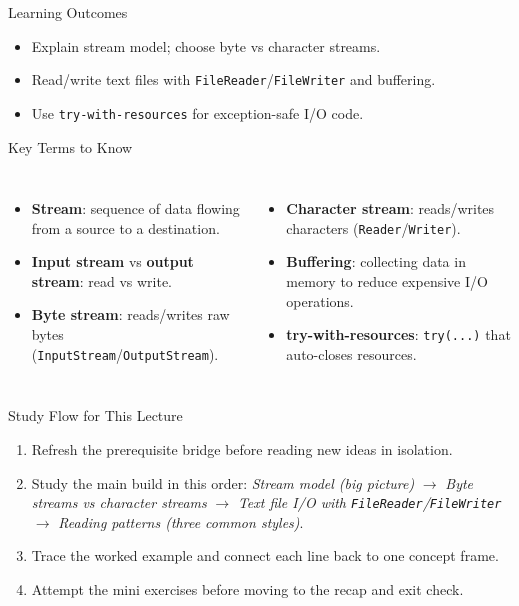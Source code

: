 \documentclass{beamer}
\begin{document}
\begin{frame}{Learning Outcomes}
  \begin{itemize}[<+->]
    \item Explain stream model; choose byte vs character streams.
    \item Read/write text files with \texttt{FileReader}/\texttt{FileWriter} and buffering.
    \item Use \texttt{try-with-resources} for exception-safe I/O code.
  \end{itemize}
  \slidesources{\OOPSUnitIIISources}
\end{frame}

\begin{frame}{Key Terms to Know}
\small
\begin{columns}[t]
\begin{itemize}
  \item \textbf{Stream}: sequence of data flowing from a source to a destination.
  \item \textbf{Input stream} vs \textbf{output stream}: read vs write.
  \item \textbf{Byte stream}: reads/writes raw bytes (\texttt{InputStream}/\texttt{OutputStream}).
\end{itemize}
\begin{itemize}
  \item \textbf{Character stream}: reads/writes characters (\texttt{Reader}/\texttt{Writer}).
  \item \textbf{Buffering}: collecting data in memory to reduce expensive I/O operations.
  \item \textbf{try-with-resources}: \texttt{try(...)} that auto-closes resources.
\end{itemize}
\end{columns}
  \slidesources{\OOPSUnitIIISources}
\end{frame}

\begin{frame}{Study Flow for This Lecture}
\begin{enumerate}[<+->]
  \item Refresh the prerequisite bridge before reading new ideas in isolation.
  \item Study the main build in this order: \textit{Stream model (big picture)} $\rightarrow$ \textit{Byte streams vs character streams} $\rightarrow$ \textit{Text file I/O with \texttt{FileReader}/\texttt{FileWriter}} $\rightarrow$ \textit{Reading patterns (three common styles)}.
  \item Trace the worked example and connect each line back to one concept frame.
  \item Attempt the mini exercises before moving to the recap and exit check.
\end{enumerate}
  \slidesources{\OOPSUnitIIISources}
\end{frame}
\end{document}
